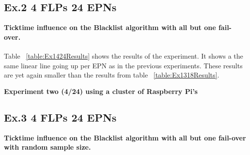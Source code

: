 \subsection*{Ex.2 4 FLPs 24 EPNs}
\textbf{Ticktime influence on the Blacklist algorithm with all but one fail-over.}
\\~\\
Table ~\ref{table:Ex1424Results} shows the results of the experiment. It shows a the same linear line going up per EPN as in the previous experiments. These results are yet again smaller than the results from table ~\ref{table:Ex1318Results}.

\begin{table}[h!]
\caption*{\textbf{Experiment two (4/24) using a cluster of Raspberry Pi's}}
\caption{Cumulative lost TFs by ticktime/EPN ratio with a flat sample size for the Blacklist algorithm}
\label{table:Ex2424Results}
\end{table}

\subsection*{Ex.3 4 FLPs 24 EPNs}
\textbf{Ticktime influence on the Blacklist algorithm with all but one fail-over with random sample size.}
\\~\\

